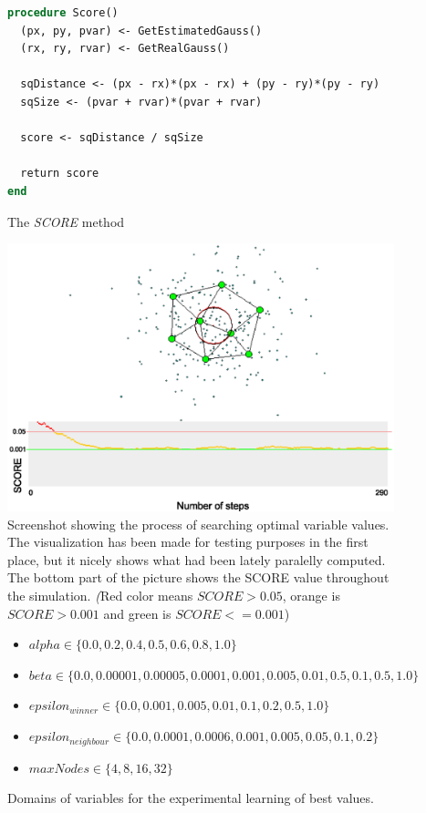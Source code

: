 \begin{figure}
\begin{lstlisting}[language=Pascal]
procedure Score()
  (px, py, pvar) <- GetEstimatedGauss()
  (rx, ry, rvar) <- GetRealGauss()
  
  sqDistance <- (px - rx)*(px - rx) + (py - ry)*(py - ry)
  sqSize <- (pvar + rvar)*(pvar + rvar)
  
  score <- sqDistance / sqSize
  
  return score
end
\end{lstlisting}       
\caption{The \emph{SCORE} method}
\label{usedalgo:scoremethod}
\end{figure}
       
\begin{figure}      
\begin{center}
\includegraphics[scale=0.75]{images/gng/experimental_setup.eps}    
\caption{Screenshot showing the process of searching optimal variable values. The visualization has been made for testing purposes in the first place, but it nicely shows what had been lately paralelly computed. The bottom part of the picture shows the SCORE value throughout the simulation. {\emph (Red color means $SCORE > 0.05$, orange is $SCORE > 0.001$ and green is $SCORE <= 0.001$)} }
\end{center}                          
\label{usedalgo:gngexperimentscreen}
\end{figure}

\begin{figure}          
\begin{itemize}
\item $alpha \in \{0.0, 0.2, 0.4, 0.5, 0.6, 0.8, 1.0\}$
\item $beta \in \{0.0, 0.00001, 0.00005, 0.0001, 0.001, 0.005, 0.01, 0.5, 0.1, 0.5, 1.0\}$
\item $epsilon_{winner} \in \{0.0, 0.001, 0.005, 0.01, 0.1, 0.2, 0.5, 1.0\}$
\item $epsilon_{neighbour} \in \{0.0, 0.0001, 0.0006, 0.001, 0.005, 0.05, 0.1, 0.2\}$
\item $maxNodes \in \{4, 8, 16, 32\}$
\end{itemize}
\caption{Domains of variables for the experimental learning of best values.}
\label{usedalgo:gngexperimentdomains}
\end{figure}

